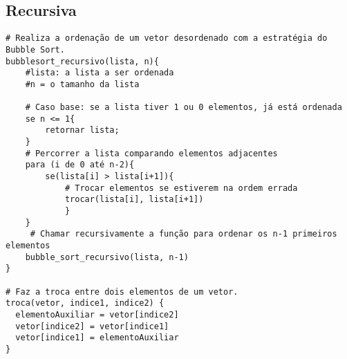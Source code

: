 \subsection{Recursiva}
\begin{verbatim}
# Realiza a ordenação de um vetor desordenado com a estratégia do Bubble Sort.
bubblesort_recursivo(lista, n){
    #lista: a lista a ser ordenada
    #n = o tamanho da lista

    # Caso base: se a lista tiver 1 ou 0 elementos, já está ordenada
    se n <= 1{
        retornar lista;
    }
    # Percorrer a lista comparando elementos adjacentes
    para (i de 0 até n-2){
        se(lista[i] > lista[i+1]){
            # Trocar elementos se estiverem na ordem errada
            trocar(lista[i], lista[i+1])
            }
    }
     # Chamar recursivamente a função para ordenar os n-1 primeiros elementos
    bubble_sort_recursivo(lista, n-1)
}    

# Faz a troca entre dois elementos de um vetor.
troca(vetor, indice1, indice2) { 
  elementoAuxiliar = vetor[indice2]
  vetor[indice2] = vetor[indice1]
  vetor[indice1] = elementoAuxiliar
}
\end{verbatim}
